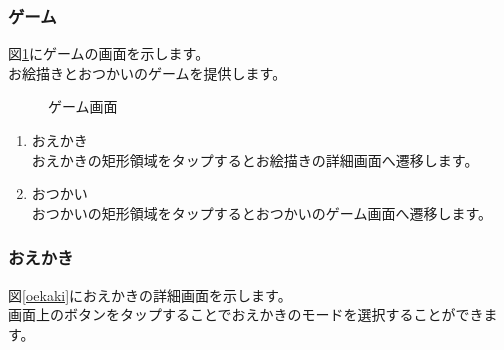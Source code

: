 \documentclass[a4j]{jarticle}
\begin{document}
\subsubsection{ゲーム}
図\ref{game}にゲームの画面を示します。\\
お絵描きとおつかいのゲームを提供します。

\begin{figure}[H]
    \begin{center}
    \caption {ゲーム画面}
    \label{game}
    \end{center}
\end{figure}

\begin{enumerate}
  \renewcommand{\labelenumi}{\textcircled{\scriptsize \theenumi}}
\item おえかき\\
  おえかきの矩形領域をタップするとお絵描きの詳細画面へ遷移します。
\item おつかい\\
  おつかいの矩形領域をタップするとおつかいのゲーム画面へ遷移します。
\end{enumerate}

\subsubsection{おえかき}
図\ref{oekaki}におえかきの詳細画面を示します。\\
画面上のボタンをタップすることでおえかきのモードを選択することができます。\\
\end{document}
